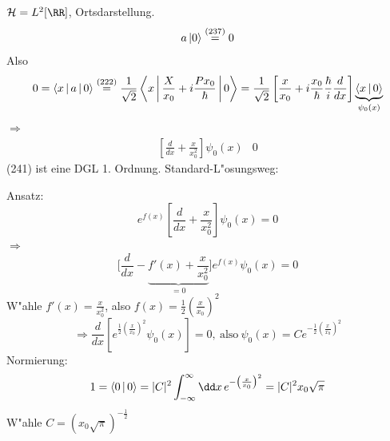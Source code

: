 \documentclass[a4paper]{scrartcl}
\begin{document}
{$\mathcal H = L^2[\RR]$, Ortsdarstellung.
$$a \ket 0 \stackrel{(237)}= 0 $$
Also
$$0 = \Braket{ x | a | 0 } \stackrel{(222)}= \frac1{\sqrt 2} \Braket{ x | \frac X {x_0} + i \frac{P x_0 }\hbar | 0 } = \frac 1{\sqrt 2} \left[ \frac x {x_0} + i \frac{ x_0}\hbar \frac \hbar i \frac d {dx} \right] \underbrace{ \Braket{ x| 0}}_{\psi_0(x)}$$
$\Longrightarrow$
\begin{align}
\left[ \frac d{dx} + \frac x{x_0^2} \right] \psi_0(x) & 0 
\end{align}
(241) ist eine DGL 1. Ordnung. Standard-L"osungsweg:

Ansatz: 
$$e^{f(x)} \left[ \frac d{dx} + \frac x{x_0^2} \right] \psi_0(x) = 0$$
$\Longrightarrow$
$$\Big[ \frac d {dx} - \underbrace{f'(x) + \frac x {x_0^2} }_{=0} \Big] e^{f(x)} \psi_0(x) = 0$$
W"ahle $f'(x) = \frac x {x_0^2}$, also $f(x) = \frac12 \left( \frac x{x_0} \right)^2$
$$\Longrightarrow \frac d{dx} \left[ e^{\frac 12 \left( \frac x{x_0} \right)^2} \psi_0(x) \right] =0, \ \mathrm{ also \ } \psi_0(x) = C e^{-\frac12 \left( \frac x{x_0} \right)^2}$$
Normierung:
$$1 = \Braket {0 | 0 } = \vert C \vert^2 \int_{-\infty}^\infty \dd x \, e^{- \left( \frac x{x_0} \right)^2} = \vert C \vert^2 x_0 \sqrt \pi$$
W"ahle $C = (x_0 \sqrt \pi)^{-\frac 12}$

}
\end{document}
